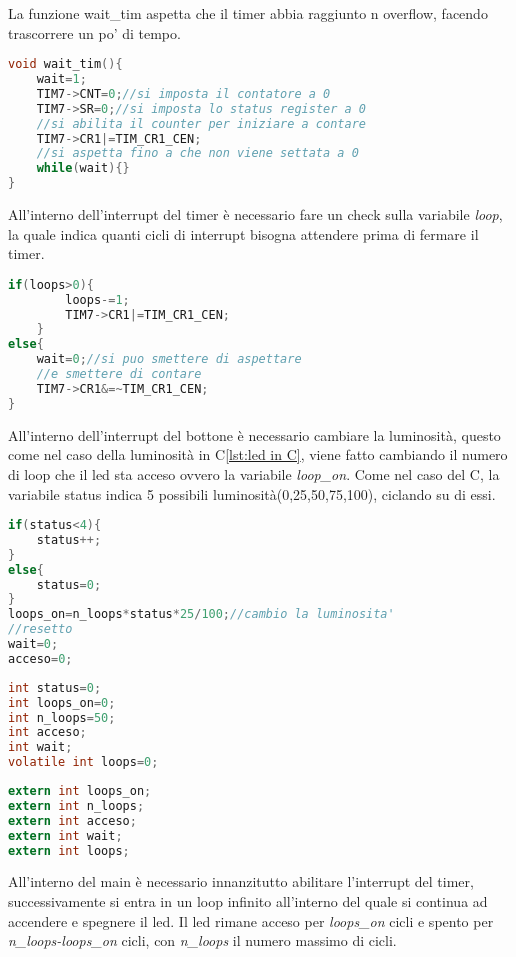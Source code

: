 \documentclass[main.tex]{subfiles}
\begin{document}
La funzione wait\_tim aspetta che il timer abbia raggiunto n overflow, facendo trascorrere un po' di tempo.
\begin{lstlisting}[language=C, caption=Funzione wait\_tim per aspettare]
void wait_tim(){
	wait=1;
	TIM7->CNT=0;//si imposta il contatore a 0
	TIM7->SR=0;//si imposta lo status register a 0
	//si abilita il counter per iniziare a contare
	TIM7->CR1|=TIM_CR1_CEN;
	//si aspetta fino a che non viene settata a 0
	while(wait){}
}
\end{lstlisting}
All'interno dell'interrupt del timer è necessario fare un check sulla variabile \textit{loop}, la quale indica quanti cicli di interrupt bisogna attendere prima di fermare il timer.  
\begin{lstlisting}[language=C, caption=Gestione dell'interrupt del timer]
if(loops>0){
		loops-=1;
		TIM7->CR1|=TIM_CR1_CEN;
	}
else{
	wait=0;//si puo smettere di aspettare
	//e smettere di contare
	TIM7->CR1&=~TIM_CR1_CEN;
}
\end{lstlisting}

All'interno dell'interrupt del bottone è necessario cambiare la luminosità, questo come nel caso della luminosità in C\ref{lst:led in C}, viene fatto cambiando il numero di loop che il led sta acceso ovvero la variabile \textit{loop\_on}. Come nel caso del C, la variabile status indica 5 possibili luminosità(0,25,50,75,100), ciclando su di essi.
\begin{lstlisting}[language=C, caption=Gestione interrupt del bottone]
if(status<4){
	status++;
}
else{
	status=0;
}
loops_on=n_loops*status*25/100;//cambio la luminosita'
//resetto
wait=0;
acceso=0;
\end{lstlisting}

\begin{lstlisting}[language=C, caption=Variabili globali interrupt]
int status=0;
int loops_on=0;
int n_loops=50;
int acceso;
int wait;
volatile int loops=0;
\end{lstlisting}

\begin{lstlisting}[language=C,caption=Variabili globali main]
extern int loops_on;
extern int n_loops;
extern int acceso;
extern int wait;
extern int loops;
\end{lstlisting}
All'interno del main è necessario innanzitutto abilitare l'interrupt del timer, successivamente si entra in un loop infinito all'interno del quale si continua ad accendere e spegnere il led. Il led rimane acceso per \textit{loops\_on} cicli e spento per \textit{n\_loops-loops\_on} cicli, con \textit{n\_loops} il numero massimo di cicli. 
\end{document}
